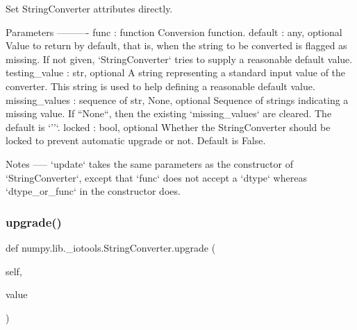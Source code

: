 \begin{DoxyVerb}Set StringConverter attributes directly.

Parameters
----------
func : function
    Conversion function.
default : any, optional
    Value to return by default, that is, when the string to be
    converted is flagged as missing. If not given,
    `StringConverter` tries to supply a reasonable default value.
testing_value : str, optional
    A string representing a standard input value of the converter.
    This string is used to help defining a reasonable default
    value.
missing_values : {sequence of str, None}, optional
    Sequence of strings indicating a missing value. If ``None``, then
    the existing `missing_values` are cleared. The default is `''`.
locked : bool, optional
    Whether the StringConverter should be locked to prevent
    automatic upgrade or not. Default is False.

Notes
-----
`update` takes the same parameters as the constructor of
`StringConverter`, except that `func` does not accept a `dtype`
whereas `dtype_or_func` in the constructor does.\end{DoxyVerb}
 \mbox{\label{classnumpy_1_1lib_1_1__iotools_1_1StringConverter_aaa5ab95c04294d5c4fc113dc89a35475}} 
\subsubsection{\texorpdfstring{upgrade()}{upgrade()}}
{\footnotesize\ttfamily def numpy.\+lib.\+\_\+iotools.\+String\+Converter.\+upgrade (\begin{DoxyParamCaption}\item[{}]{self,  }\item[{}]{value }\end{DoxyParamCaption})}

